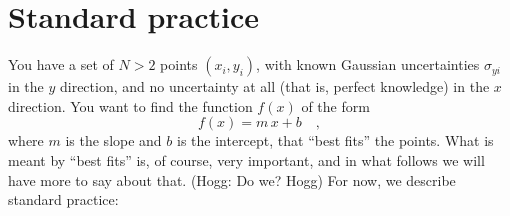 \documentclass[12pt,twoside]{article}
\begin{document}
\section{Standard practice}\label{sec:standard}

You have a set of $N>2$ points $(x_i,y_i)$, with known Gaussian
uncertainties $\sigma_{yi}$ in the $y$ direction, and no uncertainty
at all (that is, perfect knowledge) in the $x$ direction.  You want to
find the function $f(x)$ of the form
\begin{equation}\label{eq:fofx}
f(x) = m\,x + b \quad ,
\end{equation}
where $m$ is the slope and $b$ is the intercept, that ``best fits''
the points.  What is meant by ``best fits'' is, of course, very
important, and in what follows we will have more to say about that.
(Hogg: Do we? Hogg) For now, we describe standard practice:
\end{document}
